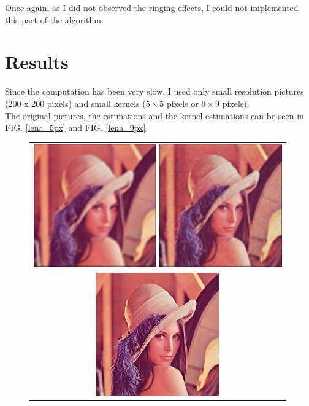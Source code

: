 \documentclass{article}
\begin{document}
Once again, as I did not observed the ringing effects, I could not implemented this part of the algorithm.

\section{Results}

Since the computation has been very slow, I used only small resolution pictures (200 x 200 pixels) and small kernels ($5\times5$ pixels or $9\times9$ pixels). \\
The original pictures, the estimations and the kernel estimations can be seen in FIG. \ref{lena_5px} and FIG. \ref{lena_9px}. \\

\begin{figure}
\begin{center}
	\begin{tabular}{c}	
		\includegraphics[scale=1]{images/blurred_5px.png}
		\includegraphics[scale=1]{images/denoised_5px.png}\\
		\includegraphics[scale=1]{images/original_5px.png}

\end{tabular}
\end{center}
\end{figure}
\end{document}
